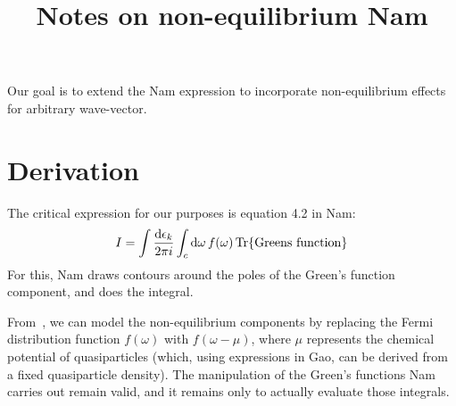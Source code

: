 \documentclass{article}
\title{Notes on non-equilibrium Nam}
\begin{document}
\maketitle

Our goal is to extend the Nam expression to incorporate non-equilibrium effects for arbitrary wave-vector.

\section{Derivation}
The critical expression for our purposes is equation 4.2 in Nam\cite{Nam1967}:
\begin{equation}
	I = \int \frac{\dd{\epsilon_k}}{2 \pi i} \int_c \dd{\omega} f(\omega) \Tr{\mathrm{Greens\ function}}
\end{equation}
For this, Nam draws contours around the poles of the Green's function component, and does the integral.

From~\cite{Gao2008}, we can model the non-equilibrium components by replacing the Fermi distribution function $f(\omega)$ with $f(\omega - \mu)$, where $\mu$ represents the chemical potential of quasiparticles (which, using expressions in Gao, can be derived from a fixed quasiparticle density).
The manipulation of the Green's functions Nam carries out remain valid, and it remains only to actually evaluate those integrals.

\printbibliography
\end{document}
